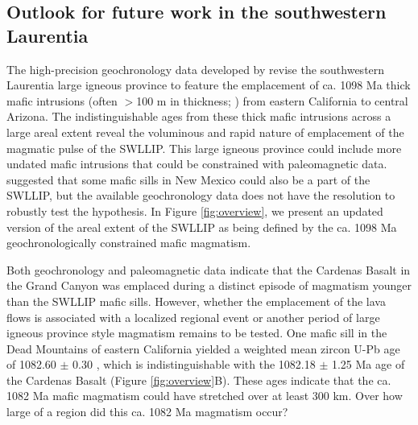 \subsection*{Outlook for future work in the southwestern Laurentia}

The high-precision geochronology data developed by \cite{Mohr2024a} revise the southwestern Laurentia large igneous province to feature the emplacement of ca. 1098 Ma thick mafic intrusions (often $>$100 m in thickness; \cite{Wright1967a}) from eastern California to central Arizona. The indistinguishable ages from these thick mafic intrusions across a large areal extent reveal the voluminous and rapid nature of emplacement of the magmatic pulse of the SWLLIP. This large igneous province could include more undated mafic intrusions that could be constrained with paleomagnetic data. \cite{Bright2014a} suggested that some mafic sills in New Mexico could also be a part of the SWLLIP, but the available geochronology data does not have the resolution to robustly test the hypothesis. In Figure \ref{fig:overview}, we present an updated version of the areal extent of the SWLLIP as being defined by the ca. 1098 Ma geochronologically constrained mafic magmatism. 

Both geochronology and paleomagnetic data indicate that the Cardenas Basalt in the Grand Canyon was emplaced during a distinct episode of magmatism younger than the SWLLIP mafic sills. However, whether the emplacement of the lava flows is associated with a localized regional event or another period of large igneous province style magmatism remains to be tested. One mafic sill in the Dead Mountains of eastern California yielded a weighted mean zircon U-Pb age of 1082.60 $\pm$ 0.30 \cite{Mohr2024a}, which is indistinguishable with the 1082.18 $\pm$ 1.25 Ma age of the Cardenas Basalt (Figure \ref{fig:overview}B). These ages indicate that the ca. 1082 Ma mafic magmatism could have stretched over at least 300 km. Over how large of a region did this ca. 1082 Ma magmatism occur?

